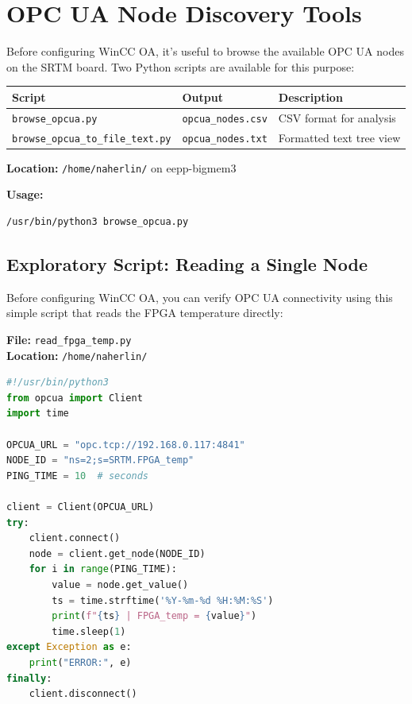 \documentclass[11pt,a4paper]{article}
\begin{document}
\section{OPC UA Node Discovery Tools}

Before configuring WinCC OA, it's useful to browse the available OPC UA nodes on the SRTM board. Two Python scripts are available for this purpose:

\begin{center}
\begin{tabular}{|l|l|l|}
\hline
\rowcolor{green!40}\textbf{Script} & \textbf{Output} & \textbf{Description} \\
\hline
\texttt{browse\_opcua.py} & \texttt{opcua\_nodes.csv} & CSV format for analysis \\
\hline
\texttt{browse\_opcua\_to\_file\_text.py} & \texttt{opcua\_nodes.txt} & Formatted text tree view \\
\hline
\end{tabular}
\end{center}

\textbf{Location:} \texttt{/home/naherlin/} on eepp-bigmem3

\textbf{Usage:}
\begin{lstlisting}
/usr/bin/python3 browse_opcua.py
\end{lstlisting}

\subsection{Exploratory Script: Reading a Single Node}

Before configuring WinCC OA, you can verify OPC UA connectivity using this simple script that reads the FPGA temperature directly:

\textbf{File:} \texttt{read\_fpga\_temp.py}\\
\textbf{Location:} \texttt{/home/naherlin/}

\begin{lstlisting}[language=Python]
#!/usr/bin/python3
from opcua import Client
import time

OPCUA_URL = "opc.tcp://192.168.0.117:4841"
NODE_ID = "ns=2;s=SRTM.FPGA_temp"
PING_TIME = 10  # seconds

client = Client(OPCUA_URL)
try:
    client.connect()
    node = client.get_node(NODE_ID)
    for i in range(PING_TIME):
        value = node.get_value()
        ts = time.strftime('%Y-%m-%d %H:%M:%S')
        print(f"{ts} | FPGA_temp = {value}")
        time.sleep(1)
except Exception as e:
    print("ERROR:", e)
finally:
    client.disconnect()
\end{lstlisting}
\end{document}
